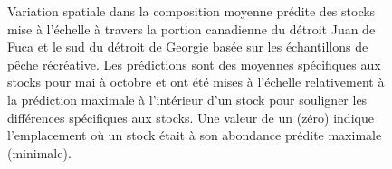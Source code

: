 \begin{figure}[H]
    \centering
    \caption{Variation spatiale dans la composition moyenne prédite des stocks mise à l'échelle à travers la portion canadienne du détroit Juan de Fuca et le sud du détroit de Georgie basée sur les échantillons de pêche récréative. Les prédictions sont des moyennes spécifiques aux stocks pour mai à octobre et ont été mises à l'échelle relativement à la prédiction maximale à l'intérieur d'un stock pour souligner les différences spécifiques aux stocks. Une valeur de un (zéro) indique l'emplacement où un stock était à son abondance prédite maximale (minimale).}
    \label{fig:spatial-pred-scaled}
\end{figure}

